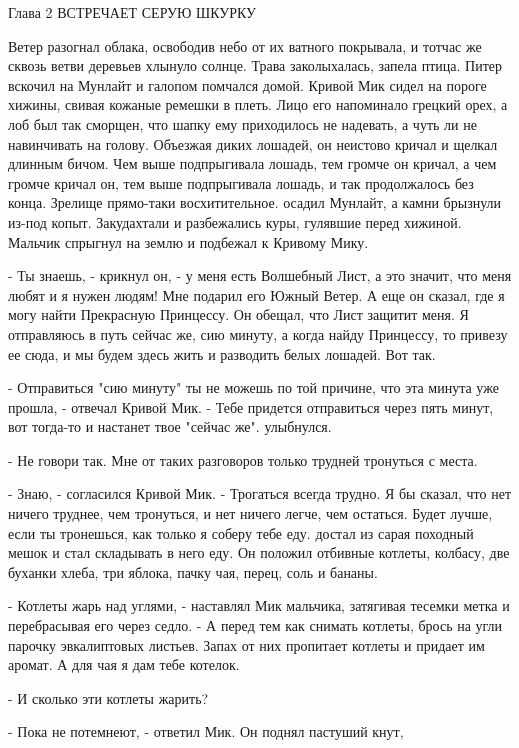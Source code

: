 Глава 2
 ВСТРЕЧАЕТ СЕРУЮ ШКУРКУ
\par{} Ветер разогнал облака, освободив небо от их ватного 
покрывала, и тотчас же сквозь ветви деревьев хлынуло солнце. Трава 
заколыхалась, запела птица. Питер вскочил на Мунлайт и галопом 
помчался домой. Кривой Мик сидел на пороге хижины, свивая кожаные 
ремешки в плеть. Лицо его напоминало грецкий орех, а лоб был так 
сморщен, что шапку ему приходилось не надевать, а чуть ли не 
навинчивать на голову. Объезжая диких лошадей, он неистово кричал и 
щелкал длинным бичом. Чем выше подпрыгивала лошадь, тем громче он 
кричал, а чем громче кричал он, тем выше подпрыгивала лошадь, и так 
продолжалось без конца. Зрелище прямо-таки восхитительное.
 осадил Мунлайт, а камни брызнули из-под копыт. Закудахтали и 
разбежались куры, гулявшие перед хижиной. Мальчик спрыгнул на землю и 
подбежал к Кривому Мику.
\par- Ты знаешь, - крикнул он, - у меня есть Волшебный Лист, а это 
значит, что меня любят и я нужен людям! Мне подарил его Южный Ветер. А 
еще он сказал, где я могу найти Прекрасную Принцессу. Он обещал, что 
Лист защитит меня. Я отправляюсь в путь сейчас же, сию минуту, а когда 
найду Принцессу, то привезу ее сюда, и мы будем здесь жить и разводить 
белых лошадей. Вот так.
\par- Отправиться "сию минуту" ты не можешь по той причине, что эта 
минута уже прошла, - отвечал Кривой Мик. - Тебе придется отправиться 
через пять минут, вот тогда-то и настанет твое "сейчас же".
 улыбнулся.
\par- Не говори так. Мне от таких разговоров только трудней тронуться 
с места.
\par- Знаю, - согласился Кривой Мик. - Трогаться всегда трудно. Я бы 
сказал, что нет ничего труднее, чем тронуться, и нет ничего легче, чем 
остаться. Будет лучше, если ты тронешься, как только я соберу тебе 
еду.
 достал из сарая походный мешок и стал складывать в него 
еду. Он положил отбивные котлеты, колбасу, две буханки хлеба, три 
яблока, пачку чая, перец, соль и бананы.
\par- Котлеты жарь над углями, - наставлял Мик мальчика, затягивая 
тесемки метка и перебрасывая его через седло. - А перед тем как 
снимать котлеты, брось на угли парочку эвкалиптовых листьев. Запах от 
них пропитает котлеты и придает им аромат. А для чая я дам тебе 
котелок.
\par- И сколько эти котлеты жарить?
\par- Пока не потемнеют, - ответил Мик. Он поднял пастуший кнут, 
